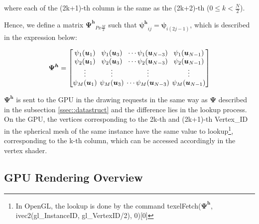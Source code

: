 \documentclass[twoside,twocolumn,10pt]{article}
\begin{document}
where each of the (2k+1)-th column is the same as the (2k+2)-th ($0 \leq k < \frac{N}{2}$).

Hence, we define a matrix $\bm{\Psi^h}_{Px\frac{M}{2}}$ such that $\bm{\psi^h}_{ij} = \bm{\psi}_{i(2j-1)}$, which is described in the expression below:


\begin{equation*}
\label{eq::Psi_changed}
\bm{\Psi^h} = 
\begingroup %
\setlength\arraycolsep{2pt}
\begin{bmatrix} 
    \psi_1(\bm{u}_1) & \psi_1(\bm{u}_3) & \cdots \psi_1(\bm{u}_{N-3}) & \psi_1(\bm{u}_{N-1})  \\
    
     \psi_2(\bm{u}_1)& \psi_2(\bm{u}_3) & \cdots \psi_2(\bm{u}_{N-3}) & \psi_2(\bm{u}_{N-1}) \\

    \vdots & \vdots & \vdots & \vdots  \\
    
     \psi_M(\bm{u}_1)&\psi_M(\bm{u}_3) & \cdots \psi_M(\bm{u}_{N-3}) & \psi_M(\bm{u}_{N-1})
    
\end{bmatrix}
\endgroup
\end{equation*}

$\bm{\Psi^h}$ is sent to the GPU in the drawing requests in the same way as $\bm{\Psi}$ described in the subsection \ref{ssec::datastruct} and the difference lies in the lookup process. On the GPU, the vertices corresponding to the 2k-th and (2k+1)-th Vertex\_ID in the spherical mesh of the same instance have the same value to lookup\footnote{In OpenGL, the lookup is done by the command texelFetch($\bm{\Psi^h}$, ivec2(gl\_InstanceID, gl\_VertexID/2), 0)[0]}, corresponding to the k-th column, which can be accessed accordingly in the vertex shader.




\subsection{GPU Rendering Overview}
\label{ssec::rendering}
\end{document}
